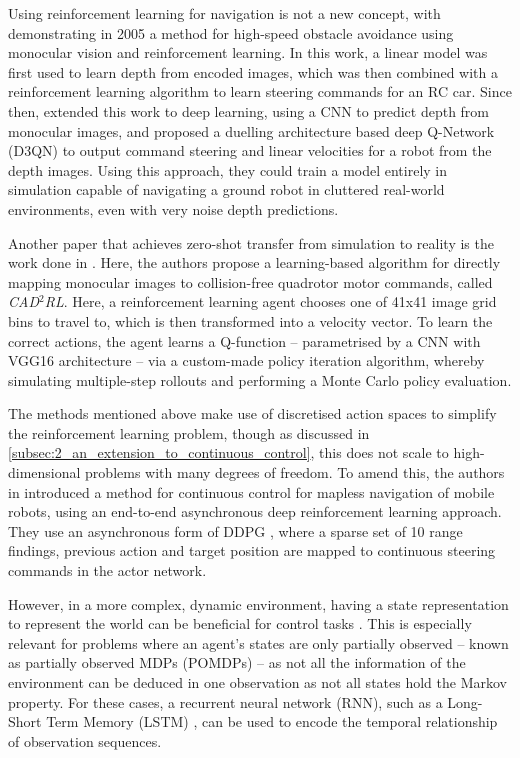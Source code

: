 Using reinforcement learning for navigation is not a new concept, with \cite{highSpeedObstacleAvoidanceMonocularVision2005} demonstrating in 2005 a method for high-speed obstacle avoidance using monocular vision and reinforcement learning. In this work, a linear model was first used to learn depth from encoded images, which was then combined with a reinforcement learning algorithm to learn steering commands for an RC car.
Since then, \cite{TowardsMonocularVisionObstacleAvoidanceDeepRL2017} extended this work to deep learning, using a CNN to predict depth from monocular images, and proposed a duelling architecture based deep Q-Network (D3QN) to output command steering and linear velocities for a robot from the depth images. Using this approach, they could train a model entirely in simulation capable of navigating a ground robot in cluttered real-world environments, even with very noise depth predictions.

Another paper that achieves zero-shot transfer from simulation to reality is the work done in \cite{cad2rl}. Here, the authors propose a learning-based algorithm for directly mapping monocular images to collision-free quadrotor motor commands, called \textit{CAD}$^2$\textit{RL}. Here, a reinforcement learning agent chooses one of 41x41 image grid bins to travel to, which is then transformed into a velocity vector. To learn the correct actions, the agent learns a Q-function -- parametrised by a CNN with VGG16 architecture \cite{vgg16} -- via a custom-made policy iteration algorithm, whereby simulating multiple-step rollouts and performing a Monte Carlo policy evaluation.

The methods mentioned above make use of discretised action spaces to simplify the reinforcement learning problem, though as discussed in \cref{subsec:2_an_extension_to_continuous_control}, this does not scale to high-dimensional problems with many degrees of freedom. To amend this, the authors in \cite{virtualToRealRLContinuousControlForMaplessNavigation} introduced a method for continuous control for mapless navigation of mobile robots, using an end-to-end asynchronous deep reinforcement learning approach. They use an asynchronous form of DDPG \cite{DDPG}, where a sparse set of 10 range findings, previous action and target position are mapped to continuous steering commands in the actor network.

However, in a more complex, dynamic environment, having a state representation to represent the world can be beneficial for control tasks \cite{stateRepresentation_overview}. This is especially relevant for problems where an agent's states are only partially observed -- known as partially observed MDPs (POMDPs) -- as not all the information of the environment can be deduced in one observation as not all states hold the Markov property. For these cases, a recurrent neural network (RNN), such as a Long-Short Term Memory (LSTM) \cite{LSTM}, can be used to encode the temporal relationship of observation sequences.

